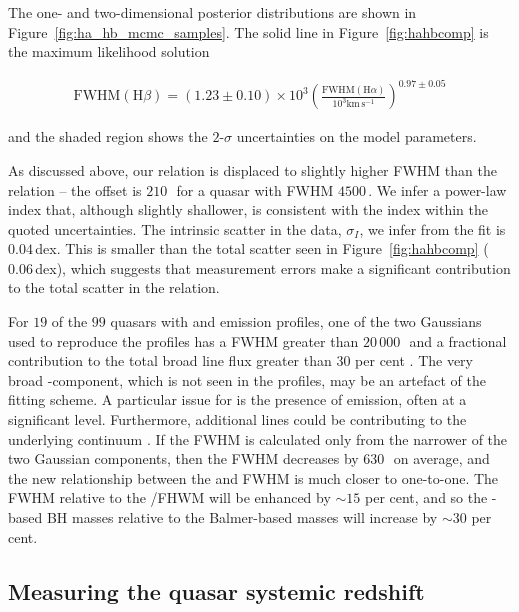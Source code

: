 The one- and two-dimensional posterior distributions are shown in Figure~\ref{fig:ha_hb_mcmc_samples}. 
The solid line in Figure~\ref{fig:hahbcomp} is the maximum likelihood solution

\begingroup\makeatletter{}\check@mathfonts
\begin{eqnarray}
  \label{eq:ha2hb}
  \text{FWHM}(\text{H}\beta) = \left( 1.23 \pm 0.10 \right) \times 10^3 \left( \frac{\text{FWHM}(\text{H}\alpha)}{10^3 \text{km}\,\text{s}^{-1}} \right)^{0.97 \pm 0.05}
\end{eqnarray}
\endgroup

\noindent and the shaded region shows the $2$-$\sigma$ uncertainties on the model parameters.

As discussed above, our relation is displaced to slightly higher \hb FWHM than the \citet{greene05b} relation -- the offset is $210$\,\kms\, for a quasar with \ha FWHM $4500$\,\kms.  
We infer a power-law index that, although slightly shallower, is consistent with the \citet{greene05b} index within the quoted uncertainties. 
The intrinsic scatter in the data, $\sigma_I$, we infer from  the fit is $0.04$\,dex. 
This is smaller than the total scatter seen in Figure~\ref{fig:hahbcomp} ($0.06$\,dex), which suggests that measurement errors make a significant contribution to the total scatter in the relation. 

For $19$ of the $99$ quasars with \hb and \ha emission profiles, one of the two Gaussians used to reproduce the \hb profiles has a FWHM greater than $20$\,$000$\,\kms\, and a fractional contribution to the total \hb broad line flux greater than $30$ per cent \citep{marziani09,marziani13}.  
The very broad \hbns-component, which is not seen in the \ha profiles, may be an artefact of the fitting scheme.
A particular issue for \hb is the presence of  emission, often at a significant level.
Furthermore, additional lines could be contributing to the underlying continuum \citep[e.g. the \ll$4922$,$5017$ doublet;][]{veron02,zamfir10}. 
If the \hb FWHM is calculated only from the narrower of the two Gaussian components, then the \hb FWHM decreases by $630$\,\kms\, on average, and the new relationship between the \ha and \hb FWHM is much closer to one-to-one. 
The  FWHM relative to the \hans/\hb FHWM will be enhanced by $\sim15$ per cent, and so the -based BH masses relative to the Balmer-based masses will increase by $\sim30$ per cent. 

\subsection{Measuring the quasar systemic redshift}
\label{sec:zsys}

